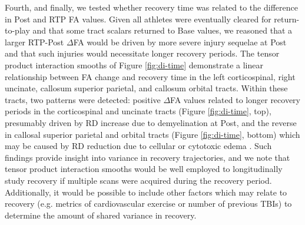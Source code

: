 \documentclass[12pt]{article}
\begin{document}
Fourth, and finally, we tested whether recovery time was related to the difference in Post and RTP FA values. Given all athletes were eventually cleared for return-to-play and that some tract scalars returned to Base values, we reasoned that a larger RTP-Post $\Delta$FA would be driven by more severe injury sequelae at Post and that such injuries would necessitate longer recovery periods. The tensor product interaction smooths of Figure \ref{fig:di-time} demonstrate a linear relationship between FA change and recovery time in the left corticospinal, right uncinate, callosum superior parietal, and callosum orbital tracts. Within these tracts, two patterns were detected: positive $\Delta$FA values related to longer recovery periods in the corticospinal and uncinate tracts (Figure \ref{fig:di-time}, top), presumably driven by RD increase due to demyelination at Post, and the reverse in callosal superior parietal and orbital tracts (Figure \ref{fig:di-time}, bottom) which may be caused by RD reduction due to cellular or cytotoxic edema \parencite{mayer2017SpectrumMildTraumatic,borja2018DiffusionMRImaging}. Such findings provide insight into variance in recovery trajectories, and we note that tensor product interaction smooths would be well employed to longitudinally study recovery if multiple scans were acquired during the recovery period. Additionally, it would be possible to include other factors which may relate to recovery (e.g. metrics of cardiovascular exercise or number of previous TBIs) to determine the amount of shared variance in recovery.
\end{document}
